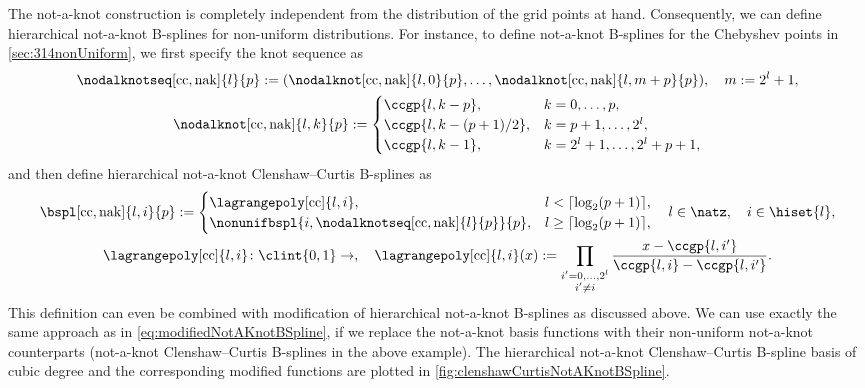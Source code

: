 The not-a-knot construction is completely independent from the
distribution of the grid points at hand.
Consequently, we can define hierarchical not-a-knot B-splines
for non-uniform distributions.
For instance, to define not-a-knot B-splines for the
Chebyshev points in \cref{sec:314nonUniform},
we first specify the knot sequence as
\begin{subequations}
  \begin{gather}
    \nodalknotseq[\cc,\nak]{l}{p}
    := (\nodalknot[\cc,\nak]{l,0}{p}, \dotsc,
    \nodalknot[\cc,\nak]{l,m+p}{p}),\quad
    m := 2^l + 1,\\
    \nodalknot[\cc,\nak]{l,k}{p}
    :=
    \begin{cases}
      \ccgp{l,k-p},&
      k = 0, \dotsc, p,\\
      \ccgp{l,k-(p+1)/2},&
      k = p + 1, \dotsc, 2^l,\\
      \ccgp{l,k-1},&
      k = 2^l + 1, \dotsc, 2^l + p + 1,
    \end{cases}
  \end{gather}
\end{subequations}
and then define hierarchical not-a-knot Clenshaw--Curtis B-splines as
\begin{subequations}
  \begin{gather}
    \bspl[\cc,\nak]{l,i}{p}
    :=
    \begin{cases}
      \lagrangepoly[\cc]{l,i},&
      l < \lceil\log_2(p+1)\rceil,\\
      \nonunifbspl{i,\nodalknotseq[\cc,\nak]{l}{p}}{p},&
      l \ge \lceil\log_2(p+1)\rceil,
    \end{cases}\quad
    l \in \natz,\quad
    i \in \hiset{l},\\
    \lagrangepoly[\cc]{l,i}\colon \clint{0, 1} \to \real,\quad
    \lagrangepoly[\cc]{l,i}(x)
    := \prod_{\substack{i'=0,\dotsc,2^l\\i'\not=i}}
    \frac{x - \ccgp{l,i'}}%
    {\ccgp{l,i} - \ccgp{l,i'}}.
  \end{gather}
\end{subequations}
This definition can even be combined with modification
of hierarchical not-a-knot B-splines as discussed above.
We can use exactly the same approach as in
\eqref{eq:modifiedNotAKnotBSpline}, if we replace the
not-a-knot basis functions with their non-uniform not-a-knot counterparts
(not-a-knot Clenshaw--Curtis B-splines in the above example).
The hierarchical not-a-knot Clenshaw--Curtis B-spline basis of
cubic degree and the corresponding modified functions are plotted in
\cref{fig:clenshawCurtisNotAKnotBSpline}.

